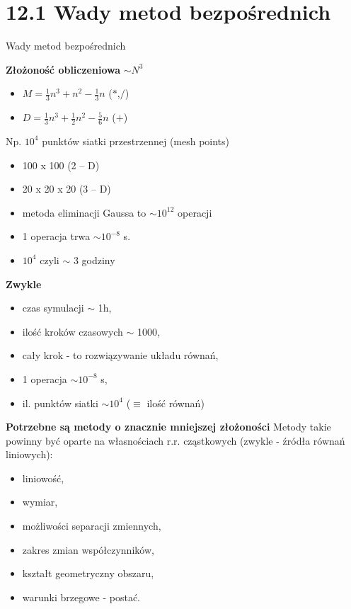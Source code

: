 \section{12.1 Wady metod bezpośrednich}

\begin{frame}{Wady metod bezpośrednich}
  \begin{block}{\textbf{Złożoność obliczeniowa} ${\sim}N^3$}
    \begin{itemize}
      \item{ $M=\frac{1}{3}n^3+n^2-\frac{1}{3}n$ ($*$,$/$)}
      \item{ $D=\frac{1}{3}n^3+\frac{1}{2}n^2-\frac{5}{6}n$ ($+$)}
    \end{itemize}
    Np. $10^4$ punktów siatki przestrzennej (mesh points)
    \begin{itemize}
      \item{100 x 100   (2 -- D)}
      \item{20 x 20 x 20   (3 -- D)}
      \item{metoda eliminacji Gaussa to $\sim 10^{12}$ operacji}
      \item{1 operacja trwa $\sim 10^{-8}$ s.}
      \item{$10^4$ czyli $\sim$ 3 godziny}
    \end{itemize}
  \end{block}
\end{frame}

\begin{frame}{}
  \begin{block}{\textbf{Zwykle}}
    \begin{itemize}
      \item{czas symulacji $\sim$ 1h,}
      \item{ilość kroków czasowych $\sim$ 1000,}
      \item{cały krok - to rozwiązywanie układu równań,}
      \item{1 operacja $\sim 10^{-8}$ s,}
      \item{il. punktów siatki $\sim 10^4$ ($\equiv$ ilość równań)}
    \end{itemize}
  \end{block}
\end{frame}

\begin{frame}{}
  \begin{block}{\textbf{Potrzebne są metody o znacznie mniejszej złożoności}}
    Metody takie powinny być oparte na własnościach r.r. cząstkowych (zwykle - źródła równań liniowych):
    \begin{itemize}
      \item{liniowość,}
      \item{wymiar,}
      \item{możliwości separacji zmiennych,}
      \item{zakres zmian współczynników,}
      \item{kształt geometryczny obszaru,}
      \item{warunki brzegowe - postać.}
    \end{itemize}
  \end{block}
\end{frame}

